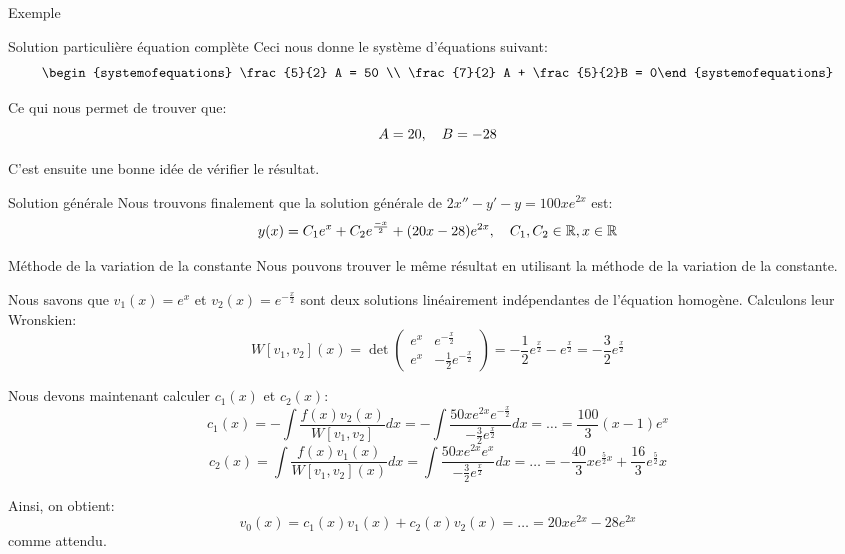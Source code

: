 \documentclass[a4paper]{article}
\begin{document}
\begin{parag}{Exemple}
\begin{subparag}{Solution particulière équation complète}
        Ceci nous donne le système d'équations suivant:
        \[\begin{systemofequations} \frac{5}{2} A = 50 \\ \frac{7}{2} A + \frac{5}{2}B = 0\end{systemofequations}\]

        Ce qui nous permet de trouver que:
        \[A = 20, \quad B = -28\]

        C'est ensuite une bonne idée de vérifier le résultat.
    \end{subparag}

    \begin{subparag}{Solution générale}
        Nous trouvons finalement que la solution générale de $2x'' - y'- y = 100xe^{2x}$ est:
        \[y\left(x\right) = C_1e^{x} + C_2e^{\frac{-x}{2}} + \left(20x - 28\right)e^{2x}, \mathspace C_1, C_2 \in \mathbb{R}, x \in \mathbb{R}\]
    \end{subparag}

    \begin{subparag}{Méthode de la variation de la constante}
        Nous pouvons trouver le même résultat en utilisant la méthode de la variation de la constante.

        Nous savons que $v_1\left(x\right) = e^{x}$ et $v_2\left(x\right) = e^{-\frac{x}{2}}$ sont deux solutions linéairement indépendantes de l'équation homogène. Calculons leur Wronskien:
        \[W\left[v_1, v_2\right]\left(x\right) = \det\begin{pmatrix} e^{x} & e^{-\frac{x}{2}} \\ e^{x} & -\frac{1}{2}e^{-\frac{x}{2}} \end{pmatrix} = -\frac{1}{2}e^{\frac{x}{2}} - e^{\frac{x}{2}} = -\frac{3}{2} e^{\frac{x}{2}} \]

        Nous devons maintenant calculer $c_1\left(x\right)$ et $c_2\left(x\right)$:
        \[c_1\left(x\right) = - \int \frac{f\left(x\right) v_2\left(x\right)}{W\left[v_1, v_2\right]} dx = - \int \frac{50x e^{2x} e^{-\frac{x}{2}}}{- \frac{3}{2} e^{\frac{x}{2}}} dx = \ldots = \frac{100}{3} \left(x - 1\right)e^{x}\]
        \[c_2\left(x\right) = \int \frac{f\left(x\right) v_1\left(x\right)}{W\left[v_1, v_2\right]\left(x\right)}dx = \int \frac{50x e^{2x} e^{x}}{-\frac{3}{2} e^{\frac{x}{2}}}dx = \ldots = -\frac{40}{3} xe^{\frac{5}{2}x} + \frac{16}{3} e^{\frac{5}{2}}x\]

        Ainsi, on obtient:
        \[v_0\left(x\right) = c_1\left(x\right)v_1\left(x\right) + c_2\left(x\right) v_2\left(x\right) = \ldots = 20x e^{2x} - 28e^{2x}\]
        comme attendu.
    \end{subparag}
\end{parag}
\end{document}

